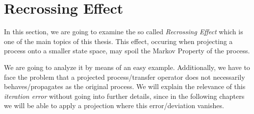 \section{Recrossing Effect}
\label{sec:recrossing}


In this section, we are going to examine the so called \textit{Recrossing Effect} which is one of the main topics of this thesis.
This effect, occuring when projecting a process onto a smaller state space, may spoil the Markov Property of the process. 

We are going to analyze it by means of an easy example.
Additionally, we have to face the problem that a projected process/transfer operator does not necessarily behaves/propagates as the original process. We will explain the relevance of this \textit{iteration error} without going into further details, since in the following chapters we will be able to apply a projection where this error/deviation vanishes.



